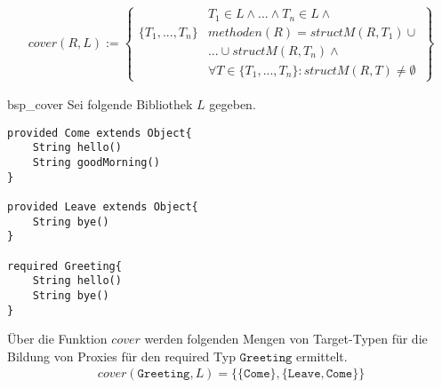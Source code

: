 \begin{gather*}
cover(R,L) := 
\left\{\begin{array}{l|l}
					& T_1 \in L \wedge \text{...} \wedge T_n \in L 								\wedge \mathit{ }\\
\{T_1,...,T_n\}		& \mathit{methoden(R)} = \mathit{structM(R,T_1)}							\cup \mathit{ }\\
					& \texttt{...} \cup \mathit{structM(R, T_n)} 								\wedge \mathit{ }\\
					& \forall T \in \{T_1,...,T_n\}:											\mathit{structM(R,T)} \neq \emptyset
\end{array}\right\}
\end{gather*}

\begin{example}{bsp_cover}
Sei folgende Bibliothek $L$ gegeben.
\begin{lstlisting}[style = dsl]
provided Come extends Object{
	String hello()
	String goodMorning()
}

provided Leave extends Object{
	String bye()
}

required Greeting{
	String hello()
	String bye()
}
\end{lstlisting}
Über die Funktion $\mathit{cover}$ werden folgenden Mengen von Target-Typen für die Bildung von Proxies für den required Typ $\texttt{Greeting}$ ermittelt.
\begin{gather*}
\mathit{cover(\texttt{Greeting},L)} = \{
	\{\texttt{Come}\},\{\texttt{Leave}, \texttt{Come}\}
\}
\end{gather*}
\end{example}

